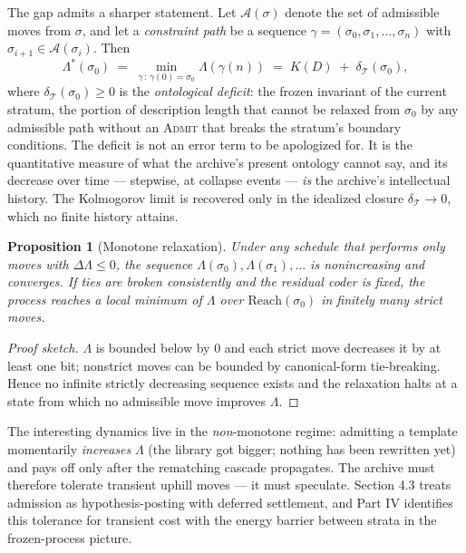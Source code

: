 \documentclass[11pt,oneside]{book}
\newtheorem{proposition}[theorem]{Proposition}
\theoremstyle{remark}
\newcommand{\Adm}{\mathcal{A}}
\newcommand{\Tem}{\mathcal{T}}
\newcommand{\Reach}{\mathrm{Reach}}
\newcommand{\Kol}{K}
\begin{document}
The gap admits a sharper statement. Let $\Adm(\sigma)$ denote the set
of admissible moves from $\sigma$, and let a \emph{constraint path} be
a sequence $\gamma = (\sigma_0, \sigma_1, \dots, \sigma_n)$ with
$\sigma_{i+1} \in \Adm(\sigma_i)$. Then
\[
\Lambda^\ast(\sigma_0)
\;=\; \min_{\gamma \,:\, \gamma(0) = \sigma_0} \Lambda(\gamma(n))
\;=\; \Kol(D) \;+\; \delta_{\Tem}(\sigma_0),
\]
where $\delta_{\Tem}(\sigma_0) \ge 0$ is the \emph{ontological
deficit}: the frozen invariant of the current stratum, the portion of
description length that cannot be relaxed from $\sigma_0$ by any
admissible path without an \textsc{Admit} that breaks the stratum's
boundary conditions. The deficit is not an error term to be apologized
for. It is the quantitative measure of what the archive's present
ontology cannot say, and its decrease over time --- stepwise, at
collapse events --- \emph{is} the archive's intellectual history. The
Kolmogorov limit is recovered only in the idealized closure
$\delta_{\Tem} \to 0$, which no finite history attains.

\begin{proposition}[Monotone relaxation]
Under any schedule that performs only moves with
$\Delta\Lambda \le 0$, the sequence $\Lambda(\sigma_0), \Lambda(\sigma_1),
\dots$ is nonincreasing and converges. If ties are broken consistently
and the residual coder is fixed, the process reaches a local minimum of
$\Lambda$ over $\Reach(\sigma_0)$ in finitely many strict moves.
\end{proposition}

\begin{proof}[Proof sketch]
$\Lambda$ is bounded below by $0$ and each strict move decreases it by
at least one bit; nonstrict moves can be bounded by canonical-form
tie-breaking. Hence no infinite strictly decreasing sequence exists and
the relaxation halts at a state from which no admissible move improves
$\Lambda$.
\end{proof}

The interesting dynamics live in the \emph{non}-monotone regime:
admitting a template momentarily \emph{increases} $\Lambda$ (the library
got bigger; nothing has been rewritten yet) and pays off only after the
rematching cascade propagates. The archive must therefore tolerate
transient uphill moves --- it must speculate. Section 4.3 treats
admission as hypothesis-posting with deferred settlement, and Part IV
identifies this tolerance for transient cost with the energy barrier
between strata in the frozen-process picture.
\end{document}
